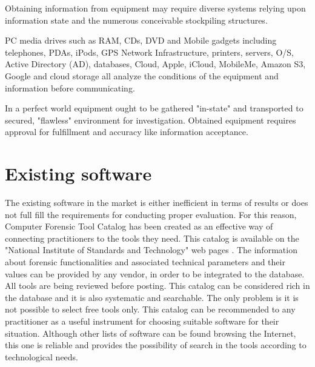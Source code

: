 Obtaining information from equipment may require diverse systems relying upon information state and the numerous conceivable stockpiling structures. 

PC media drives such as RAM, CDs, DVD and Mobile gadgets including telephones, PDAs, iPods, GPS Network Infrastructure, printers, servers, O/S, Active Directory (AD),  databases, Cloud, Apple, iCloud, MobileMe, Amazon S3, Google and cloud storage all analyze the conditions of the equipment and information before communicating.


In a perfect world equipment ought to be gathered "in-state" and transported to secured, "flawless" environment for investigation. Obtained equipment requires approval for fulfillment and accuracy like information acceptance.



%

\section{Existing software}

The existing software in the market is either inefficient in terms of results or does not full fill the requirements for conducting proper evaluation. For this reason, Computer Forensic Tool Catalog has been created as an effective way of connecting practitioners to the tools they need. This catalog is available on the "National Institute of Standards and Technology" web pages \cite{10}. The information about forensic functionalities and associated technical parameters and their values can be provided by any vendor, in order to be integrated to the database. All tools are being reviewed before posting. This catalog can be considered rich in the database and it is also systematic and searchable. The only problem is it is not possible to select free tools only. This catalog can be recommended to any practitioner as a useful instrument for choosing suitable software for their situation. Although other lists of software can be found browsing the Internet, this one is reliable and provides the possibility of search in the tools according to technological needs.

